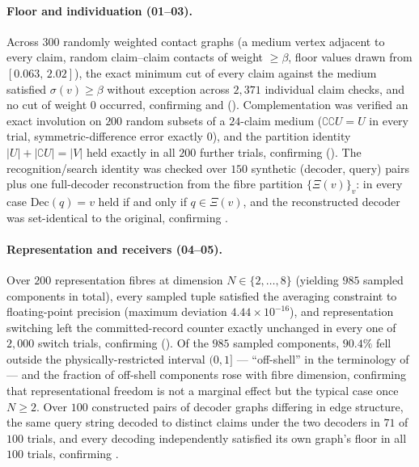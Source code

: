 \documentclass[11pt,twocolumn,a4paper]{article}
\theoremstyle{thmstyle}
\theoremstyle{definition}
\theoremstyle{remark}
\newcommand{\flo}{\beta}
\newcommand{\co}{\complement}
\newcommand{\str}{\sigma}
\newcommand{\Proj}{\Xi}
\begin{document}
\paragraph{Floor and individuation (01--03).}
Across $300$ randomly weighted contact graphs (a medium vertex adjacent to
every claim, random claim--claim contacts of weight $\ge\flo$, floor
values drawn from $[0.063,\,2.02]$), the exact minimum cut of every claim
against the medium satisfied $\str(v)\ge\flo$ without exception across
$2{,}371$ individual claim checks, and no cut of weight $0$ occurred,
confirming  and 
(). Complementation was verified an exact
involution on $200$ random subsets of a $24$-claim medium ($\co\co U=U$ in
every trial, symmetric-difference error exactly $0$), and the partition
identity $|U|+|\co U|=|V|$ held exactly in all $200$ further trials,
confirming  (). The
recognition/search identity was checked over $150$ synthetic
(decoder, query) pairs plus one full-decoder reconstruction from the fibre
partition $\{\Proj(v)\}_v$: in every case $\mathrm{Dec}(q)=v$ held if and
only if $q\in\Proj(v)$, and the reconstructed decoder was set-identical to
the original, confirming .

\paragraph{Representation and receivers (04--05).}
Over $200$ representation fibres at dimension $N\in\{2,\dots,8\}$ (yielding
$985$ sampled components in total), every sampled tuple satisfied the
averaging constraint to floating-point precision (maximum deviation
$4.44\times10^{-16}$), and representation switching left the
committed-record counter exactly unchanged in every one of $2{,}000$
switch trials, confirming 
(). Of the $985$ sampled components,
$90.4\%$ fell outside the physically-restricted interval $(0,1]$ ---
``off-shell'' in the terminology of  --- and the
fraction of off-shell components rose with fibre dimension, confirming
that representational freedom is not a marginal effect but the typical
case once $N\ge2$. Over $100$ constructed pairs of decoder graphs
differing in edge structure, the same query string decoded to distinct
claims under the two decoders in $71$ of $100$ trials, and every decoding
independently satisfied its own graph's floor in all $100$ trials,
confirming .
\end{document}
